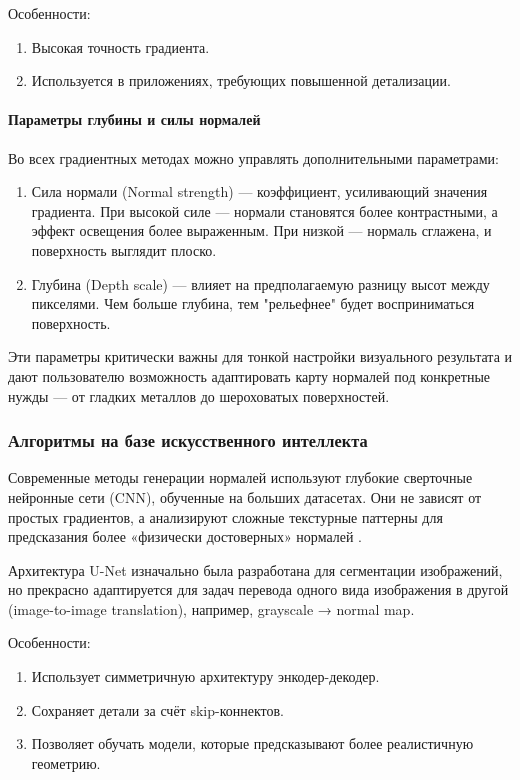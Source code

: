 Особенности:
\begin{enumerate}
	\item Высокая точность градиента.
	\item Используется в приложениях, требующих повышенной детализации.
\end{enumerate}
\paragraph{Параметры глубины и силы нормалей}

Во всех градиентных методах можно управлять дополнительными параметрами:
\begin{enumerate}
	\item Сила нормали (Normal strength) — коэффициент, усиливающий значения градиента. При высокой силе — нормали становятся более контрастными, а эффект освещения более выраженным. При низкой — нормаль сглажена, и поверхность выглядит плоско.
	\item Глубина (Depth scale) — влияет на предполагаемую разницу высот между пикселями. Чем больше глубина, тем "рельефнее" будет восприниматься поверхность.
\end{enumerate}

Эти параметры критически важны для тонкой настройки визуального результата и дают пользователю возможность адаптировать карту нормалей под конкретные нужды — от гладких металлов до шероховатых поверхностей.

\subsubsection{Алгоритмы на базе искусственного интеллекта}

Современные методы генерации нормалей используют глубокие сверточные нейронные сети (CNN), обученные на больших датасетах. Они не зависят от простых градиентов, а анализируют сложные текстурные паттерны для предсказания более «физически достоверных» нормалей \cite{shafik2020}.

Архитектура U-Net изначально была разработана для сегментации изображений, но прекрасно адаптируется для задач перевода одного вида изображения в другой (image-to-image translation), например, grayscale → normal map.

Особенности:
\begin{enumerate}
	\item Использует симметричную архитектуру энкодер-декодер.
	\item Сохраняет детали за счёт skip-коннектов.
	\item Позволяет обучать модели, которые предсказывают более реалистичную геометрию.
\end{enumerate}

